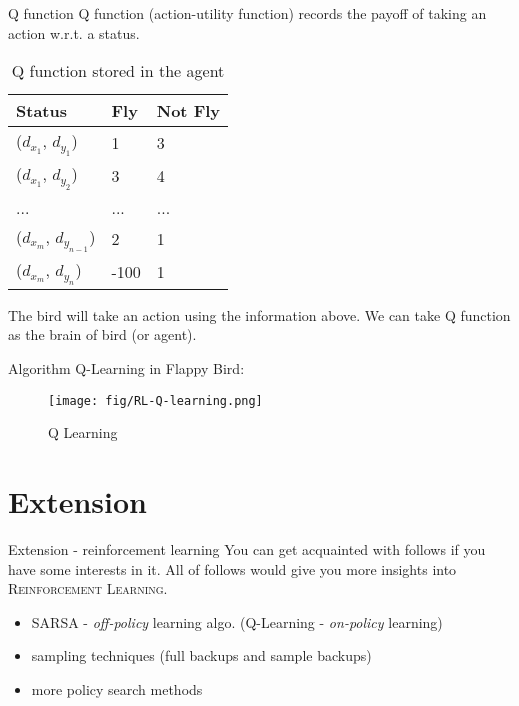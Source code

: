 \documentclass[10pt]{beamer}
\begin{document}
\begin{frame}[fragile]{Q function}
  Q function (action-utility function) records the payoff of taking an action w.r.t. a status. 
  \begin{table}  
    \caption{Q function stored in the agent}
    \begin{tabular*}{5cm}{lll}  
    \hline  
    Status & Fly  & Not Fly \\  
    \hline  
    ($d_{x_1}$, $d_{y_1}$)  & 1 & 3 \\  
    ($d_{x_1}$, $d_{y_2}$)  & 3 & 4 \\  
    ... & ... & ... \\
    ($d_{x_m}$, $d_{y_{n-1}}$)  & 2 & 1 \\  
    ($d_{x_m}$, $d_{y_n}$)  & -100 & 1 \\  
    \hline
    \end{tabular*}
  \end{table}

  The bird will take an action using the information above. We can take \alert{Q function} as the brain of bird (or agent).
\end{frame}

\begin{frame}{Algorithm}
  Q-Learning in Flappy Bird:
  \begin{figure}[htbp]
    \centering
    \texttt{[image: fig/RL-Q-learning.png]}
    \caption{Q Learning}
  \end{figure}
\end{frame}

\section{Extension}

\begin{frame}{Extension - reinforcement learning}
  You can get acquainted with follows if you have some interests in it. All of follows would give you more insights into \textsc{Reinforcement Learning}.
  \begin{itemize}
    \item SARSA - \textit{off-policy} learning algo. (Q-Learning - \textit{on-policy} learning)
    \item sampling techniques (full backups and sample backups)
    \item more policy search methods
  \end{itemize}
\end{frame}
\end{document}
